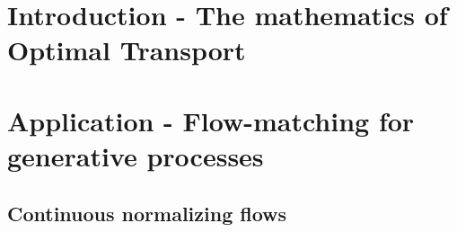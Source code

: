 \documentclass{article} %
\title{}
\author{}
\date{\today}
\begin{document}
\maketitle %


\section{Introduction - The mathematics of Optimal Transport}


\section{Application - Flow-matching for generative processes}

\subsection{Continuous normalizing flows}

\subsection{}

\subsection{}
\end{document}
